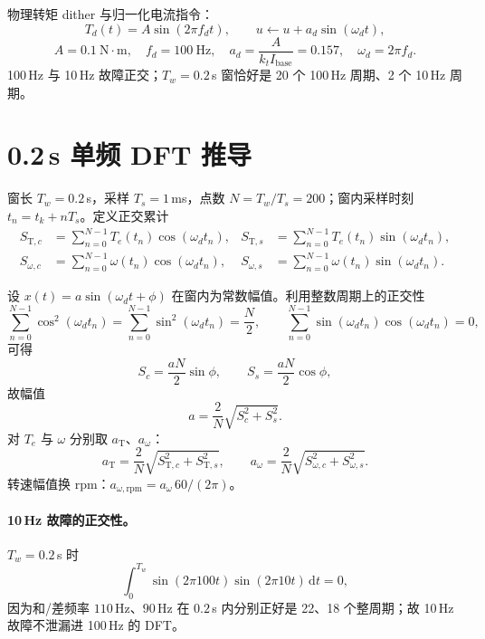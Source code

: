 \documentclass[11pt,a4paper]{article}
\newcommand{\Te}{T_e}
\newcommand{\rpm}{\mathrm{rpm}}
\begin{document}
物理转矩 dither 与归一化电流指令：
\begin{equation}
T_d(t)=A\sin(2\pi f_dt),\qquad
u\leftarrow u+a_d\sin(\omega_dt),
\label{eq:dither}
\end{equation}
\begin{equation}
A=0.1\ \mathrm{N\cdot m},\quad f_d=100\ \mathrm{Hz},\quad
a_d=\frac{A}{k_tI_{\mathrm{base}}}=0.157,\quad \omega_d=2\pi f_d.
\label{eq:ad}
\end{equation}
100\,Hz 与 10\,Hz 故障正交；$T_w=0.2$\,s 窗恰好是 20 个 100\,Hz 周期、2 个 10\,Hz 周期。

\section{0.2\,s 单频 DFT 推导}

窗长 $T_w=0.2$\,s，采样 $T_s=1$\,ms，点数 $N=T_w/T_s=200$；窗内采样时刻 $t_n=t_k+nT_s$。定义正交累计
\begin{align}
S_{\mathrm{T},c}&=\sum_{n=0}^{N-1}\Te(t_n)\cos(\omega_dt_n),&
S_{\mathrm{T},s}&=\sum_{n=0}^{N-1}\Te(t_n)\sin(\omega_dt_n),\label{eq:ST}\\
S_{\omega,c}&=\sum_{n=0}^{N-1}\omega(t_n)\cos(\omega_dt_n),&
S_{\omega,s}&=\sum_{n=0}^{N-1}\omega(t_n)\sin(\omega_dt_n).\label{eq:Sw}
\end{align}

设 $x(t)=a\sin(\omega_dt+\phi)$ 在窗内为常数幅值。利用整数周期上的正交性
\begin{equation}
\sum_{n=0}^{N-1}\cos^2(\omega_dt_n)=\sum_{n=0}^{N-1}\sin^2(\omega_dt_n)=\frac{N}{2},
\qquad
\sum_{n=0}^{N-1}\sin(\omega_dt_n)\cos(\omega_dt_n)=0,
\label{eq:orth}
\end{equation}
可得
\begin{equation}
S_c=\frac{aN}{2}\sin\phi,\qquad S_s=\frac{aN}{2}\cos\phi,
\label{eq:ScSs}
\end{equation}
故幅值
\begin{equation}
a=\frac{2}{N}\sqrt{S_c^2+S_s^2}.
\label{eq:amp}
\end{equation}
对 $\Te$ 与 $\omega$ 分别取 $a_{\mathrm{T}}$、$a_{\omega}$：
\begin{equation}
a_{\mathrm{T}}=\frac{2}{N}\sqrt{S_{\mathrm{T},c}^2+S_{\mathrm{T},s}^2},\qquad
a_{\omega}=\frac{2}{N}\sqrt{S_{\omega,c}^2+S_{\omega,s}^2}.
\label{eq:amps}
\end{equation}
转速幅值换 rpm：$a_{\omega,\rpm}=a_{\omega}\,60/(2\pi)$。

\paragraph{10\,Hz 故障的正交性。}
$T_w=0.2$\,s 时
\begin{equation}
\int_0^{T_w}\sin(2\pi100t)\sin(2\pi10t)\,\mathrm{d}t=0,
\label{eq:orth10}
\end{equation}
因为和/差频率 $110$\,Hz、$90$\,Hz 在 $0.2$\,s 内分别正好是 22、18 个整周期；故 10\,Hz 故障不泄漏进 100\,Hz 的 DFT。
\end{document}
